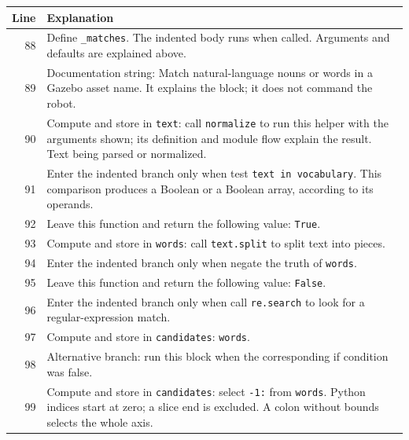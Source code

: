 \documentclass[11pt,a4paper]{book}
\begin{document}
\begin{longtable}{r p{}}

\textbf{Line} & \textbf{Explanation} \\ \hline \endhead

88 & Define \texttt{\_matches}. The indented body runs when called. Arguments and defaults are explained above. \\

89 & Documentation string: Match natural-language nouns or words in a Gazebo asset name. It explains the block; it does not command the robot. \\

90 & Compute and store in \texttt{text}: call \texttt{normalize} to run this helper with the arguments shown; its definition and module flow explain the result. Text being parsed or normalized. \\

91 & Enter the indented branch only when test \texttt{text in vocabulary}. This comparison produces a Boolean or a Boolean array, according to its operands. \\

92 & Leave this function and return the following value: \texttt{True}. \\

93 & Compute and store in \texttt{words}: call \texttt{text.split} to split text into pieces.  \\

94 & Enter the indented branch only when negate the truth of \texttt{words}. \\

95 & Leave this function and return the following value: \texttt{False}. \\

96 & Enter the indented branch only when call \texttt{re.search} to look for a regular-expression match. \\

97 & Compute and store in \texttt{candidates}: \texttt{words}.  \\

98 & Alternative branch: run this block when the corresponding if condition was false. \\

99 & Compute and store in \texttt{candidates}: select \texttt{-1:} from \texttt{words}. Python indices start at zero; a slice end is excluded. A colon without bounds selects the whole axis.  \\


\end{longtable}
\end{document}
